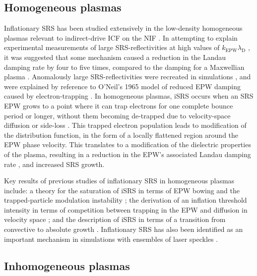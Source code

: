 \subsection{Homogeneous plasmas}
Inflationary SRS has been studied
extensively in the low-density homogeneous plasmas relevant to indirect-drive ICF on the NIF
\citep{Vu2002,Yin2006,Vu2007,Strozzi2007,Yin2008,Yin2012,Ellis2012}.
In attempting to explain experimental measurements of large SRS-reflectivities at high values of $k_\mathrm{EPW}\lambda_\mathrm{D}$
\citep{Fernandez2000,Montgomery2002}, it was suggested that some mechanism caused a reduction in the Landau damping
rate by four to five times, compared to the damping for a Maxwellian plasma \citep{Montgomery2002}.
Anomalously large SRS-reflectivities were recreated in simulations \citep{Vu2001,Vu2002}, and were explained by
reference to O'Neil's 1965 model of reduced EPW  damping caused by electron-trapping \citep{ONeil1965}.
In homogeneous plasmas, iSRS occurs when an SRS EPW grows to a point where it can trap electrons for one
complete bounce period or longer, without them becoming de-trapped due to velocity-space diffusion or
side-loss \citep{Vu2002}. This trapped electron population leads to modification of the distribution
function, in the form of a locally flattened region around the EPW phase velocity.
This translates to a modification of the dielectric properties of the plasma, resulting in a reduction in
the EPW's associated Landau damping rate \citep{ONeil1965,Vu2002}, and increased SRS growth.

 Key results of previous studies of inflationary SRS in homogeneous plasmas include: a theory for the saturation
 of iSRS in terms of EPW bowing and the trapped-particle modulation instability \citep{Yin2008}; the derivation
 of an inflation threshold intensity in terms of competition between trapping in the EPW and diffusion in
 velocity space \citep{Vu2007}; and the description of iSRS in terms of a transition from convective to absolute
 growth \citep{Wang2018}. Inflationary SRS has also been identified as an important mechanism in simulations  with ensembles of laser speckles \citep{Yin2012,Winjum2019}.

\subsection{Inhomogeneous plasmas}

